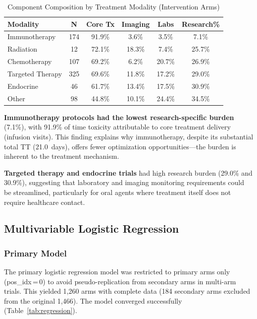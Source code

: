 \documentclass[11pt,a4paper]{article}
\begin{document}
\begin{table}[H]
\centering
\caption{Component Composition by Treatment Modality (Intervention Arms)}
\label{tab:component_mod}
\begin{tabular}{lccccc}
\toprule
\textbf{Modality} & \textbf{N} & \textbf{Core Tx} & \textbf{Imaging} & \textbf{Labs} & \textbf{Research\%} \\
\midrule
Immunotherapy & 174 & 91.9\% & 3.6\% & 3.5\% & 7.1\% \\
Radiation & 12 & 72.1\% & 18.3\% & 7.4\% & 25.7\% \\
Chemotherapy & 107 & 69.2\% & 6.2\% & 20.7\% & 26.9\% \\
Targeted Therapy & 325 & 69.6\% & 11.8\% & 17.2\% & 29.0\% \\
Endocrine & 46 & 61.7\% & 13.4\% & 17.5\% & 30.9\% \\
Other & 98 & 44.8\% & 10.1\% & 24.4\% & 34.5\% \\
\bottomrule
\end{tabular}
\end{table}

\textbf{Immunotherapy protocols had the lowest research-specific burden} (7.1\%), with 91.9\% of time toxicity attributable to core treatment delivery (infusion visits). This finding explains why immunotherapy, despite its substantial total TT (21.0~days), offers fewer optimization opportunities---the burden is inherent to the treatment mechanism.

\textbf{Targeted therapy and endocrine trials} had high research burden (29.0\% and 30.9\%), suggesting that laboratory and imaging monitoring requirements could be streamlined, particularly for oral agents where treatment itself does not require healthcare contact.

\subsection{Multivariable Logistic Regression}

\subsubsection{Primary Model}

The primary logistic regression model was restricted to primary arms only (pos\_idx\,=\,0) to avoid pseudo-replication from secondary arms in multi-arm trials. This yielded 1{,}260 arms with complete data (184 secondary arms excluded from the original 1{,}466). The model converged successfully (Table~\ref{tab:regression}).
\end{document}
